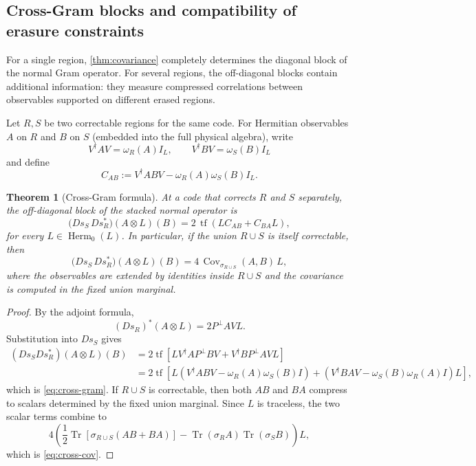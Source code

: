 \documentclass[11pt]{article}
\newtheorem{theorem}{Theorem}[section]
\theoremstyle{definition}
\newcommand{\Herm}{\operatorname{Herm}}
\newcommand{\Tr}{\operatorname{Tr}}
\newcommand{\tf}{\operatorname{tf}}
\newcommand{\Cov}{\operatorname{Cov}}
\newcommand{\1}{\mathbf 1}
\begin{document}
\subsection{Cross-Gram blocks and compatibility of erasure constraints}

For a single region, \cref{thm:covariance} completely determines the diagonal block of the normal Gram operator.  For several regions, the off-diagonal blocks contain additional information: they measure compressed correlations between observables supported on different erased regions.

Let $R,S$ be two correctable regions for the same code.  For Hermitian observables $A$ on $R$ and $B$ on $S$ (embedded into the full physical algebra), write
\[
V^\dagger A V=\omega_R(A)I_L,
\qquad
V^\dagger B V=\omega_S(B)I_L
\]
and define
\begin{equation}
C_{AB}
:=
V^\dagger ABV-\omega_R(A)\omega_S(B)I_L.
\label{eq:cab}
\end{equation}

\begin{theorem}[Cross-Gram formula]
\label{thm:cross-gram}
At a code that corrects $R$ and $S$ separately, the off-diagonal block of the stacked normal operator is
\begin{equation}
\boxed{
\bigl(Ds_S\,Ds_R^*\bigr)(A\otimes L)(B)
=
2\,\tf\!\left(
L C_{AB}+C_{BA}L
\right),
}
\label{eq:cross-gram}
\end{equation}
for every $L\in\Herm_0(L)$.  In particular, if the union $R\cup S$ is itself correctable, then
\begin{equation}
\boxed{
\bigl(Ds_S\,Ds_R^*\bigr)(A\otimes L)(B)
=
4\,\Cov_{\sigma_{R\cup S}}(A,B)\,L,
}
\label{eq:cross-cov}
\end{equation}
where the observables are extended by identities inside $R\cup S$ and the covariance is computed in the fixed union marginal.
\end{theorem}

\begin{proof}
By the adjoint formula,
\[
(Ds_R)^*(A\otimes L)=2P^\perp AVL.
\]
Substitution into $Ds_S$ gives
\begin{align*}
(Ds_S Ds_R^*)(A\otimes L)(B)
&=
2\tf\!\left[
L V^\dagger A P^\perp BV
+
V^\dagger B P^\perp AV L
\right]\\
&=
2\tf\!\left[
L\!\left(V^\dagger ABV-\omega_R(A)\omega_S(B)I\right)
+
\left(V^\dagger BAV-\omega_S(B)\omega_R(A)I\right)L
\right],
\end{align*}
which is \eqref{eq:cross-gram}.  If $R\cup S$ is correctable, then both $AB$ and $BA$ compress to scalars determined by the fixed union marginal.  Since $L$ is traceless, the two scalar terms combine to
\[
4\left(
\frac12\Tr[\sigma_{R\cup S}(AB+BA)]
-\Tr(\sigma_R A)\Tr(\sigma_S B)
\right)L,
\]
which is \eqref{eq:cross-cov}.
\end{proof}
\end{document}
